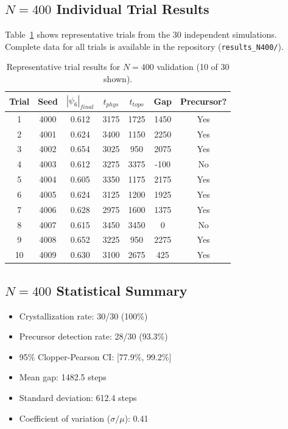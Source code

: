 \documentclass[11pt]{article}
\begin{document}
\subsection{$N=400$ Individual Trial Results}

Table~\ref{tab:n400trials} shows representative trials from the 30 independent simulations. Complete data for all trials is available in the repository (\texttt{results\_N400/}).

\begin{table}[h]
\centering
\caption{Representative trial results for $N=400$ validation (10 of 30 shown).}
\label{tab:n400trials}
\begin{tabular}{ccccccc}
\toprule
\textbf{Trial} & \textbf{Seed} & \textbf{$|\psi_6|_{final}$} & \textbf{$t_{phys}$} & \textbf{$t_{topo}$} & \textbf{Gap} & \textbf{Precursor?} \\
\midrule
1 & 4000 & 0.612 & 3175 & 1725 & 1450 & Yes \\
2 & 4001 & 0.624 & 3400 & 1150 & 2250 & Yes \\
3 & 4002 & 0.654 & 3025 & 950 & 2075 & Yes \\
4 & 4003 & 0.612 & 3275 & 3375 & -100 & No \\
5 & 4004 & 0.605 & 3350 & 1175 & 2175 & Yes \\
6 & 4005 & 0.624 & 3125 & 1200 & 1925 & Yes \\
7 & 4006 & 0.628 & 2975 & 1600 & 1375 & Yes \\
8 & 4007 & 0.615 & 3450 & 3450 & 0 & No \\
9 & 4008 & 0.652 & 3225 & 950 & 2275 & Yes \\
10 & 4009 & 0.630 & 3100 & 2675 & 425 & Yes \\
\bottomrule
\end{tabular}
\end{table}

\subsection{$N=400$ Statistical Summary}

\begin{itemize}
    \item Crystallization rate: 30/30 (100\%)
    \item Precursor detection rate: 28/30 (93.3\%)
    \item 95\% Clopper-Pearson CI: [77.9\%, 99.2\%]
    \item Mean gap: 1482.5 steps
    \item Standard deviation: 612.4 steps
    \item Coefficient of variation ($\sigma/\mu$): 0.41
\end{itemize}
\end{document}
